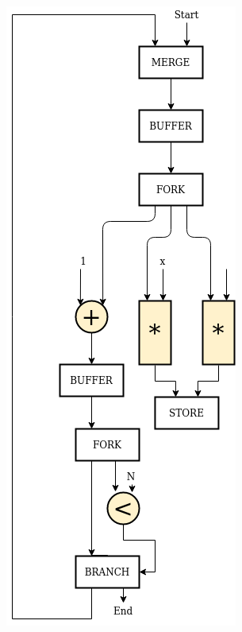 \documentclass{beamer}
\begin{document}
\begin{frame}[fragile]
\begin{columns}[T]
\begin{column}{0.45\textwidth}
      \includegraphics[scale=0.28]{base_case.png}
    \end{column}
  \end{columns}
\end{frame}
\end{document}

